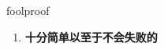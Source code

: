 
\begin{frame}
{\huge foolproof}
\begin{center}
\begin{enumerate}\Large
  \item \textbf{十分简单以至于不会失败的}
\end{enumerate}
\end{center}
\end{frame}
